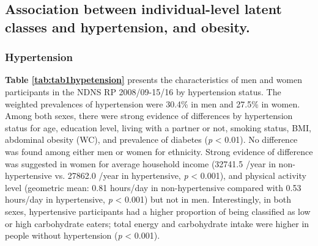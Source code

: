 

\subsection{Association between individual-level latent classes and hypertension, and obesity.}\vspace{-0.3cm}

\subsubsection{Hypertension}\vspace{-0.3cm}

\textbf{Table \ref{tab:tab1hypetension}} presents the characteristics of men and women participants in the NDNS RP 2008/09-15/16 by hypertension status. The weighted prevalences of hypertension were 30.4\% in men and 27.5\% in women. Among both sexes, there were strong evidence of differences by hypertension status for age, education level, living with a partner or not, smoking status, BMI, abdominal obesity (WC), and prevalence of diabetes (\textit{p} < 0.01). No difference was found among either men or women for ethnicity. Strong evidence of difference was suggested in women for average household income (32741.5 \textsterling/year in non-hypertensive vs. 27862.0 \textsterling/year in hypertensive, \textit{p} < 0.001), and physical activity level (geometric mean: 0.81 hours/day in non-hypertensive compared with 0.53 hours/day in hypertensive, \textit{p} < 0.001) but not in men. Interestingly, in both sexes, hypertensive participants had a higher proportion of being classified as low or high carbohydrate eaters; total energy and carbohydrate intake were higher in people without hypertension (\textit{p} < 0.001).

